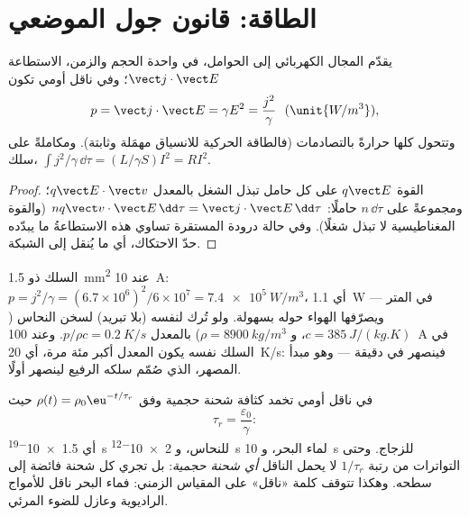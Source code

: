 \section{الطاقة: قانون جول الموضعي}

\begin{proposition}\label{prop:b2:charges-currents-conduction:joule}
يقدّم المجال الكهربائي إلى الحوامل، في واحدة الحجم والزمن،
الاستطاعة $\vect j\cdot\vect E$؛ وفي ناقل أومي تكون
\[
p = \vect j\cdot\vect E = \gamma E^2 = \frac{j^2}\gamma \ \ (\unit{W/m^3}) ,
\]
وتتحول كلها حرارةً بالتصادمات (فالطاقة الحركية للانسياق
مهمَلة وثابتة). ومكاملةً على سلك، $\int j^2/\gamma\,\dd\tau
= (L/\gamma S)I^2 = RI^2$.
\end{proposition}

\begin{proof}
القوة $q\vect E$ على كل حامل تبذل الشغل بالمعدل $q\vect E\cdot\vect v$؛
ومجموعةً على $n\,\dd\tau$ حاملًا: $nq\vect v\cdot\vect E\,\dd\tau = \vect j\cdot
\vect E\,\dd\tau$ (والقوة المغناطيسية لا تبذل شغلًا). وفي حالة درودة
المستقرة تساوي هذه الاستطاعةُ ما يبدّده حدّ الاحتكاك، أي
ما يُنقل إلى الشبكة.
\end{proof}

\begin{example}\label{ex:b2:charges-currents-conduction:heating}
السلك ذو \qty{1.5}{mm^2} عند \qty{10}{A}: $p = j^2/\gamma = (6.7 \times 10^6)^2/6 \times 10^7 =
\qty{7.4e5}{W/m^3}$، أي \qty{1.1}{W} في المتر --- ويصرّفها الهواء
حوله بسهولة. ولو تُرك لنفسه (بلا تبريد) لسخن النحاس ($c = \qty{385}{J/(kg.K)}$،
و $\rho = \qty{8900}{kg/m^3}$) بالمعدل $p/\rho c = \qty{0.2}{K/s}$. وعند \qty{100}{A}
في السلك نفسه يكون المعدل أكبر مئة مرة، أي \qty{20}{K/s}: فينصهر
في دقيقة --- وهو مبدأ المصهر، الذي صُمّم سلكه الرفيع
لينصهر أولًا.
\end{example}

\begin{proposition}\label{prop:b2:charges-currents-conduction:relaxation}
في ناقل أومي تخمد كثافة شحنة حجمية وفق $\rho(t) =
\rho_0\eu^{-t/\tau_r}$ حيث
\[
\tau_r = \frac{\varepsilon_0}{\gamma} :
\]
أي \qty{1.5e-19}{s} للنحاس، و \qty{2e-12}{s} لماء البحر، و \qty{10}{s} للزجاج.
وحتى التواترات من رتبة $1/\tau_r$ لا يحمل الناقل \emph{أي
شحنة حجمية}: بل تجري كل شحنة فائضة إلى سطحه. وهكذا تتوقف كلمة
«ناقل» على المقياس الزمني: فماء البحر ناقل
للأمواج الراديوية وعازل للضوء المرئي.
\end{proposition}

